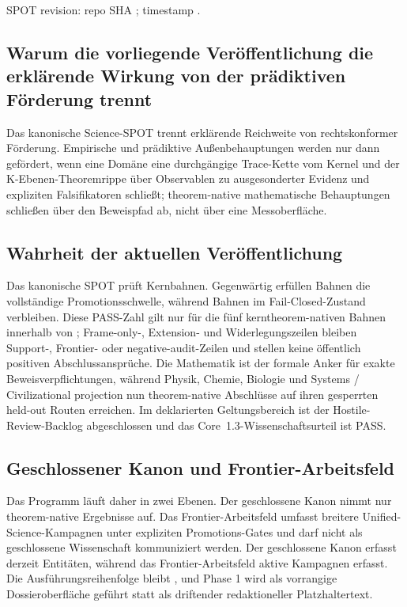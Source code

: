 SPOT revision: repo SHA ; timestamp .

\subsection{Warum die vorliegende Veröffentlichung die erklärende Wirkung von der prädiktiven Förderung trennt}
Das kanonische Science-SPOT trennt erklärende Reichweite von rechtskonformer Förderung. Empirische und prädiktive Außenbehauptungen werden nur dann gefördert, wenn eine Domäne eine durchgängige Trace-Kette vom Kernel und der K-Ebenen-Theoremrippe über Observablen zu ausgesonderter Evidenz und expliziten Falsifikatoren schließt; theorem-native mathematische Behauptungen schließen über den Beweispfad ab, nicht über eine Messoberfläche.

\subsection{Wahrheit der aktuellen Veröffentlichung}
Das kanonische SPOT prüft  Kernbahnen. Gegenwärtig erfüllen  Bahnen die vollständige Promotionsschwelle, während  Bahnen im Fail-Closed-Zustand verbleiben.
Diese PASS-Zahl gilt nur für die fünf kerntheorem-nativen Bahnen innerhalb von ; Frame-only-, Extension- und Widerlegungszeilen bleiben Support-, Frontier- oder negative-audit-Zeilen und stellen keine öffentlich positiven Abschlussansprüche.
Die Mathematik ist der formale Anker für exakte Beweisverpflichtungen, während Physik, Chemie, Biologie und Systems / Civilizational projection nun theorem-native Abschlüsse auf ihren gesperrten held-out Routen erreichen. Im deklarierten Geltungsbereich  ist der Hostile-Review-Backlog abgeschlossen und das Core~1.3-Wissenschaftsurteil ist PASS.

\subsection{Geschlossener Kanon und Frontier-Arbeitsfeld}
Das Programm läuft daher in zwei Ebenen. Der geschlossene Kanon nimmt nur theorem-native Ergebnisse auf. Das Frontier-Arbeitsfeld umfasst breitere Unified-Science-Kampagnen unter expliziten Promotions-Gates und darf nicht als geschlossene Wissenschaft kommuniziert werden.
Der geschlossene Kanon erfasst derzeit  Entitäten, während das Frontier-Arbeitsfeld  aktive Kampagnen erfasst.
Die Ausführungsreihenfolge bleibt , und Phase 1 wird als vorrangige Dossieroberfläche geführt statt als driftender redaktioneller Platzhaltertext.

